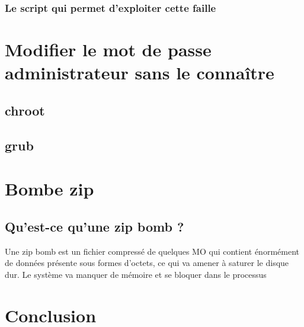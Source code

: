 \documentclass[a4paper, 12pt]{article}
\begin{document}
			\subsubsection{Le script qui permet d'exploiter cette faille}   		

   \section{Modifier le mot de passe administrateur sans le connaître}
        \subsection{chroot}
        \subsection{grub}
   \section{Bombe zip}
   		\subsection{Qu'est-ce qu'une zip bomb ?}
         Une zip bomb est un fichier compressé de quelques MO qui contient énormément de données présente sous formes d'octets, ce qui va amener à saturer le disque dur. Le système va manquer de mémoire et se bloquer dans le processus
   \section{Conclusion}

	
	
\end{document}
